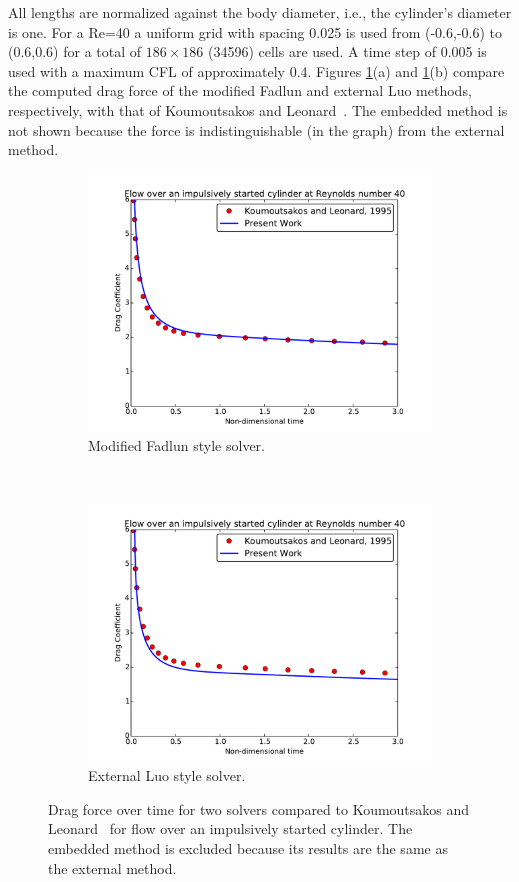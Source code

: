 All lengths are normalized against the body diameter, i.e., the cylinder's diameter is one. 
For a Re=40 a uniform grid with spacing 0.025 is used from (-0.6,-0.6) to (0.6,0.6) for a total of $186\times186$ (34596) cells are used. 
A time step of 0.005 is used with a maximum CFL of approximately 0.4. 
Figures \ref{fig:cy40}(a) and \ref{fig:cy40}(b) compare the computed drag force of the modified Fadlun and external Luo methods, respectively, with that of Koumoutsakos and Leonard~\cite{Koumoutsakos:1995bf}. The embedded method is not shown because the force is indistinguishable (in the graph) from the external method. 
\begin{figure}[!htb]
	\centering
	\begin{subfigure}{0.4\textwidth}
		\includegraphics[width=\linewidth]{cy40fadlun}
		\caption{Modified Fadlun style solver.}
	\end{subfigure}
	~
	\begin{subfigure}{0.4\textwidth}
		\includegraphics[width=\linewidth]{cy40luo}
		\caption{External Luo style solver.}
	\end{subfigure}
	\caption{Drag force over time for two solvers compared to Koumoutsakos and Leonard~\cite{Koumoutsakos:1995bf} for flow over an impulsively started cylinder. The embedded method is excluded because its results are the same as the external method.}
	\label{fig:cy40}
\end{figure}

